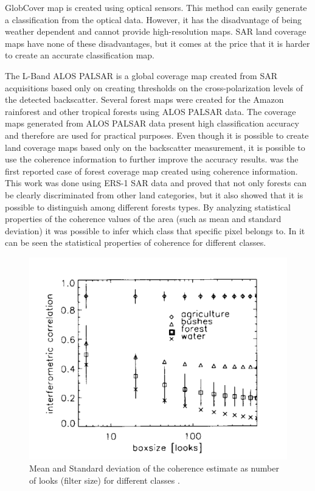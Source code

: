 GlobCover map is created using optical sensors. This method can easily generate a classification from the optical data. However, it has the disadvantage of being weather dependent and cannot provide high-resolution maps. SAR land coverage maps have none of these disadvantages, but it comes at the price that it is harder to create an accurate classification map.

The L-Band ALOS PALSAR \cite{alos1, alos2, alos3,alos4, alos5, alos6} is a global coverage map created from SAR acquisitions based only on creating thresholds on the cross-polarization levels of the detected backscatter. Several forest maps were created for the Amazon rainforest and other tropical forests using ALOS PALSAR data. The coverage maps generated from ALOS PALSAR data present high classification accuracy and therefore are used for practical purposes. Even though it is possible to create land coverage maps based only on the backscatter measurement, it is possible to use the coherence information to further improve the accuracy results. \cite{first_interferometric} was the first reported case of forest coverage map created using coherence information. This work was done using ERS-1 SAR data and proved that not only forests can be clearly discriminated from other land categories, but it also showed that it is possible to distinguish among different forests types. By analyzing statistical properties of the coherence values of the area (such as mean and standard deviation) it was possible to infer which class that specific pixel belongs to. In  it can be seen the statistical properties of coherence for different classes.

\begin{figure}[H]
    \centering
    \includegraphics[width=0.7\linewidth]{Cap2/first_interferometric.png}
    \caption{Mean and Standard deviation of the coherence estimate as number of looks (filter size) for different classes \cite{first_interferometric}.}
    \label{fig:first_interferometric_estimate}
\end{figure}


